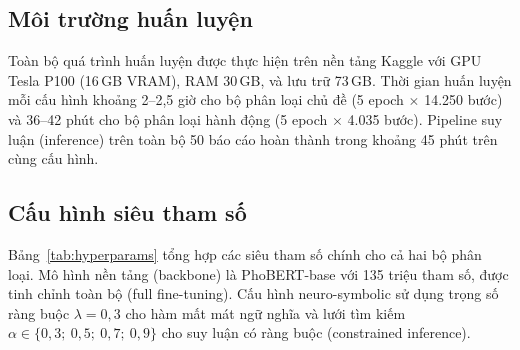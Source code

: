 \subsection{Môi trường huấn luyện}
\label{subsec:training_env}

Toàn bộ quá trình huấn luyện được thực hiện trên nền tảng Kaggle với GPU Tesla P100 (16\,GB VRAM), RAM 30\,GB, và lưu trữ 73\,GB. Thời gian huấn luyện mỗi cấu hình khoảng 2--2,5 giờ cho bộ phân loại chủ đề (5 epoch $\times$ 14.250 bước) và 36--42 phút cho bộ phân loại hành động (5 epoch $\times$ 4.035 bước). Pipeline suy luận (inference) trên toàn bộ 50 báo cáo hoàn thành trong khoảng 45 phút trên cùng cấu hình.


\subsection{Cấu hình siêu tham số}
\label{subsec:hyperparams}

Bảng~\ref{tab:hyperparams} tổng hợp các siêu tham số chính cho cả hai bộ phân loại. Mô hình nền tảng (backbone) là PhoBERT-base \citep{nguyen2020phobert} với 135 triệu tham số, được tinh chỉnh toàn bộ (full fine-tuning). Cấu hình neuro-symbolic sử dụng trọng số ràng buộc $\lambda = 0{,}3$ cho hàm mất mát ngữ nghĩa và lưới tìm kiếm $\alpha \in \{0{,}3;\ 0{,}5;\ 0{,}7;\ 0{,}9\}$ cho suy luận có ràng buộc (constrained inference).


